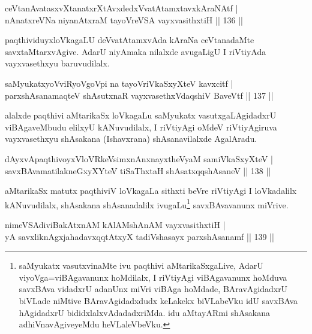 \begin{shl}
ceVtanAvatasxvXtanatxrXtAvxdedxVvatAtamxtavxkAraNAtf |\\
nAnatxreVNa niyanAtxraM tayoVreVSA vayxvasithxtiH \hfill || 136 ||
\end{shl}

\begin{artha}
paqthividuyxloVkagaLU deVvatAtamxvAda kAraNa ceVtanadaMte savxtaMtarxvAgive. AdarU niyAmaka nilalxde avugaLigU I riVtiyAda vayxvasethxyu baruvudilalx.
\end{artha}

\begin{shl}
saMyukatxyoVviRyoVgoV\s pi na tayoVriVkaSxyXteV kavxcitf |\\
parxshAsanamaqteV shAsutxnaR vayxvasethxVdaqshiV BaveVtf \hfill || 137 ||
\end{shl}

\begin{artha}
alalxde paqthivi aMtarikaSx loVkagaLu saMyukatx vasutxgaLAgidadxrU viBAgaveMbudu elilxyU kANuvudilalx, I riVtiyAgi oMdeV riVtiyAgiruva vayxvasethxyu shAsakana (Ishavxrana) shAsanavilalxde AgalAradu.
\end{artha}

\begin{shl}
dAyxvApaqthivoyxVloVRkeV\s simxnAnxnayxtheVyaM samiVkaSxyXteV |\\
savxBAvamatilakneGxyXYteV tiSaThxtaH shAsatxqqshAsaneV \hfill || 138 ||
\end{shl}

\begin{artha}
aMtarikaSx matutx paqthiviV loVkagaLa sithxti beVre riVtiyAgi I loVkadalilx kANuvudilalx, shAsakana shAsanadalilx ivugaLu\footnote[2]{saMyukatx vasutxvinaMte ivu paqthivi aMtarikaSxgaLive, AdarU viyoVga=viBAgavanunx hoMdilalx, I riVtiyAgi viBAgavanunx hoMduva savxBAva vidadxrU adanUnx miVri viBAga hoMdade, BAravAgidadxrU biVLade niMtive BAravAgidadxdudx keLakekx biVLabeVku idU savxBAva hAgidadxrU bididxlalxvAdadadxriMda. idu aMtayARmi shAsakana adhiVnavAgiveyeMdu heVLaleVbeVku.} savxBAvavanunx miVrive.
\end{artha}


\begin{shl}
nimeVSAdiviBakAtxnAM kAlAMshAnAM vayxvasithxtiH |\\
yA savxliknAgxjahadavxqqtAtxyX tadiVshasayx parxshAsanamf \hfill || 139 ||
\end{shl}

